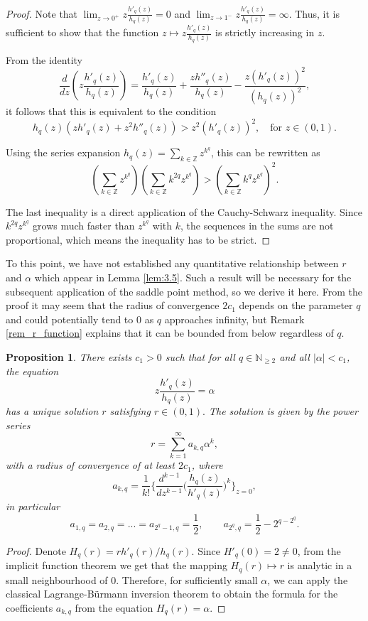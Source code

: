 \documentclass[a4paper,twoside, reqno]{amsart}
\numberwithin{equation}{section}
\newtheorem{Prop}[Thm]{Proposition}
\theoremstyle{definition}%
\theoremstyle{definition}
\theoremstyle{definition}%
\theoremstyle{definition}
\newcommand{\Z}{\mathbb{Z}}
\newcommand{\N}{\mathbb{N}}
\begin{document}
\begin{proof}
Note that $\lim_{z \to 0^+} z \frac{h'_q(z)}{h_q(z)} = 0$ and $\lim_{z \to 1^-} z \frac{h'_q(z)}{h_q(z)} = \infty$. Thus, it is sufficient to show that the function $z \mapsto z\frac{h'_q(z)}{h_q(z)}$ is strictly increasing in $z$.

From the identity
\[
\frac{d}{dz}\left(z\frac{h'_q(z)}{h_q(z)}\right) = \frac{h'_q(z)}{h_q(z)} + \frac{z h''_q(z)}{h_q(z)} - \frac{z (h'_q(z))^2}{(h_q(z))^2},
\]
it follows that this is equivalent to the condition
\[
h_q(z)\left(z h'_q(z) + z^2 h''_q(z)\right) > z^2 (h'_q(z))^2, \quad \text{for } z\in (0,1).
\]

Using the series expansion $h_q(z) = \sum_{k\in\Z} z^{k^q}$, this can be rewritten as
\[
\left( \sum_{k\in\Z} z^{k^q} \right) \left( \sum_{k\in\Z} k^{2q}z^{k^q} \right) > \left( \sum_{k\in\Z} k^q z^{k^q}\right)^2.
\]

The last inequality is a direct application of the Cauchy-Schwarz inequality. Since $k^{2q}z^{k^q}$ grows much faster than $z^{k^q}$ with $k$, the sequences in the sums are not proportional, which means the inequality has to be strict.
\end{proof}


To this point, we have not established any quantitative relationship between $r$ and $\alpha$ which appear in Lemma \ref{lem:3.5}.
Such a result will be necessary for the subsequent application of the saddle point method, so we derive it here. 
From the proof it may seem that the radius of convergence $2c_1$ depends on the parameter $q$ and could potentially tend to 0 as $q$ approaches infinity, but Remark \ref{rem_r_function} explains that it can be bounded from below regardless of $q$.

\begin{Prop}
 \label{thm:3.6}
There exists $c_1 >0$ such that for all $q\in\N_{\geq2}$ and all  $|\alpha|<c_1$,  the equation
\[
z \frac{h'_q(z)}{h_q(z)}= \alpha
\]
has a unique solution $r$ satisfying $r\in (0,1).$ The solution is given by the power series
\begin{equation} \label{r_function}
r= \sum_{k=1}^{\infty} a_{k,q} \alpha^k,
\end{equation}
with a radius of convergence of at least $2c_1$, where
\[
a_{k,q}= \frac{1}{k!} \Big\{  \frac{d^{k-1}}{dz^{k-1}} \Big(  \frac{h_q(z)}{h'_q(z)}\Big)^k \Big\}_{z=0},
\]
in particular
\[
a_{1,q}=a_{2,q}=...=a_{2^q-1,q}=\frac{1}{2},\qquad  a_{2^q,q}= \frac{1}{2} - 2^{q-2^q}.
\]
\end{Prop}
\begin{proof}
Denote $H_q(r)=rh'_q(r)/h_q(r)$. Since $H'_q(0)=2\neq 0$, from the implicit function theorem we get that the mapping $H_q(r)\mapsto r$ is analytic in a small neighbourhood of 0.
Therefore, for sufficiently small $\alpha$, we can apply the classical Lagrange-Bürmann inversion theorem to obtain the formula for the coefficients $a_{k,q}$ from the equation $H_q(r) = \alpha$.
\end{proof}
\end{document}

